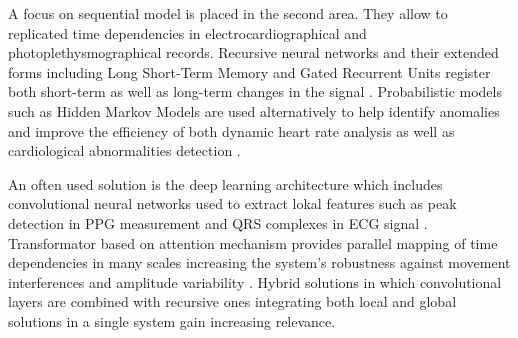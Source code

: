 \documentclass[journal]{IEEEtran}
\begin{document}
{A focus on sequential model is placed in the second area. They allow to replicated time dependencies in electrocardiographical and photoplethysmographical records.
Recursive neural networks and their extended forms including Long Short-Term Memory and Gated Recurrent Units register both short-term as well as long-term changes in the signal \cite{12}. Probabilistic models such as Hidden Markov Models are used alternatively to help identify anomalies and improve the efficiency of both dynamic heart rate analysis as well as cardiological abnormalities detection \cite{13}.

\newpage
An often used solution is the deep learning architecture which includes convolutional neural networks used to extract lokal features such as peak detection in PPG measurement and QRS complexes in ECG signal \cite{14}. Transformator based on attention mechanism provides parallel mapping of time dependencies in many scales increasing the system's robustness against movement interferences and amplitude variability \cite{15}. Hybrid solutions in which convolutional layers are combined with recursive ones integrating both local and global solutions in a single system gain increasing relevance.


}
\end{document}
